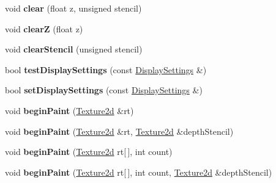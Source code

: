 \begin{DoxyCompactItemize}
\item 
\hypertarget{class_tempest_1_1_device_a30acfb19a401002b51676746a675b90c}{void {\bfseries clear} (float z, unsigned stencil)}\label{class_tempest_1_1_device_a30acfb19a401002b51676746a675b90c}

\item 
\hypertarget{class_tempest_1_1_device_a38fc47892c1f81118078ba2d803703df}{void {\bfseries clear\+Z} (float z)}\label{class_tempest_1_1_device_a38fc47892c1f81118078ba2d803703df}

\item 
\hypertarget{class_tempest_1_1_device_a1581cb19d15e8e97624af7521204e047}{void {\bfseries clear\+Stencil} (unsigned stencil)}\label{class_tempest_1_1_device_a1581cb19d15e8e97624af7521204e047}

\item 
\hypertarget{class_tempest_1_1_device_a9f2b23d5c0653abac209aa0cb9e43c82}{bool {\bfseries test\+Display\+Settings} (const \hyperlink{class_tempest_1_1_display_settings}{Display\+Settings} \&)}\label{class_tempest_1_1_device_a9f2b23d5c0653abac209aa0cb9e43c82}

\item 
\hypertarget{class_tempest_1_1_device_a9af2d698a227656ae3cd08b9fb759f5e}{bool {\bfseries set\+Display\+Settings} (const \hyperlink{class_tempest_1_1_display_settings}{Display\+Settings} \&)}\label{class_tempest_1_1_device_a9af2d698a227656ae3cd08b9fb759f5e}

\item 
\hypertarget{class_tempest_1_1_device_ad1d133803b572a92fc19a1f958dc4fe6}{void {\bfseries begin\+Paint} (\hyperlink{class_tempest_1_1_texture2d}{Texture2d} \&rt)}\label{class_tempest_1_1_device_ad1d133803b572a92fc19a1f958dc4fe6}

\item 
\hypertarget{class_tempest_1_1_device_a9f0cd709cd0705590ff02d083c66b07c}{void {\bfseries begin\+Paint} (\hyperlink{class_tempest_1_1_texture2d}{Texture2d} \&rt, \hyperlink{class_tempest_1_1_texture2d}{Texture2d} \&depth\+Stencil)}\label{class_tempest_1_1_device_a9f0cd709cd0705590ff02d083c66b07c}

\item 
\hypertarget{class_tempest_1_1_device_a722784ae67c34ac143fdeaf5ea2caba3}{void {\bfseries begin\+Paint} (\hyperlink{class_tempest_1_1_texture2d}{Texture2d} rt\mbox{[}$\,$\mbox{]}, int count)}\label{class_tempest_1_1_device_a722784ae67c34ac143fdeaf5ea2caba3}

\item 
\hypertarget{class_tempest_1_1_device_ae720108a409490d10bd11336fc0a5fde}{void {\bfseries begin\+Paint} (\hyperlink{class_tempest_1_1_texture2d}{Texture2d} rt\mbox{[}$\,$\mbox{]}, int count, \hyperlink{class_tempest_1_1_texture2d}{Texture2d} \&depth\+Stencil)}\label{class_tempest_1_1_device_ae720108a409490d10bd11336fc0a5fde}


\end{DoxyCompactItemize}
